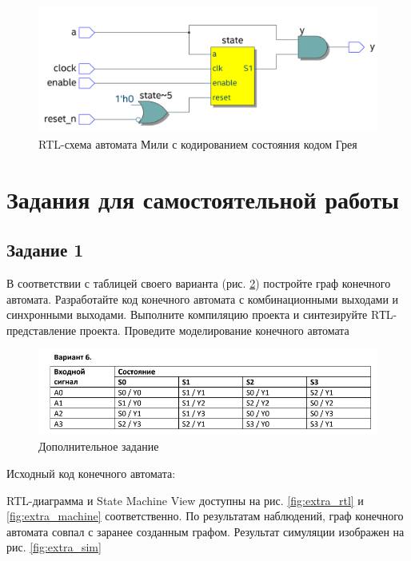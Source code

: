 \documentclass[a4paper,14pt]{article}
\begin{document}
	\begin{figure}[H]
		\centering
		\includegraphics[width=\linewidth]{images/z2_gray_rtl}
		\caption{RTL-схема автомата Мили с кодированием состояния кодом Грея}
		\label{fig:z2_gray_rtl}
	\end{figure}

	\section{Задания для самостоятельной работы}

	\subsection{Задание 1}
	
	В соответствии с таблицей своего варианта (рис. \ref{fig:extra_table}) постройте граф конечного автомата.
	Разработайте код конечного автомата с комбинационными выходами и синхронными
	выходами. Выполните компиляцию проекта и синтезируйте RТL-представление проекта.
	Проведите моделирование конечного автомата
	
	\begin{figure}[H]
		\centering
		\includegraphics[width=\linewidth]{images/extra_table}
		\caption{Дополнительное задание}
		\label{fig:extra_table}
	\end{figure}

	Исходный код конечного автомата:
	
	RTL-диаграмма и State Machine View доступны на рис. \ref{fig:extra_rtl} и \ref{fig:extra_machine} соответственно.
	По результатам наблюдений, граф конечного автомата совпал с заранее созданным графом.
	Результат симуляции изображен на рис. \ref{fig:extra_sim}
	
\end{document}
